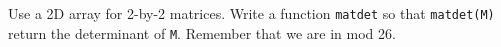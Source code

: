   Use a 2D array for 2-by-2 matrices.
  Write a function \verb!matdet! so that
  \verb!matdet(M)!
  return the determinant of \verb!M!.
  Remember that we are in mod 26.
  
